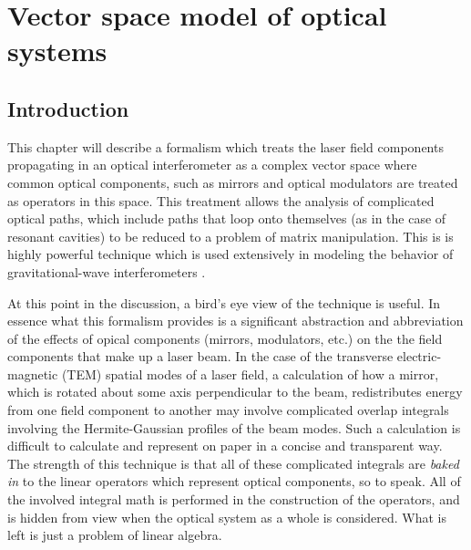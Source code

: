 

\chapter{Vector space model of optical systems}

\section{Introduction}
This chapter will describe a formalism which treats the laser field components propagating in an optical interferometer as a complex vector space where common optical components, such as mirrors and optical modulators are treated as operators in this space. %
This treatment allows the analysis of complicated optical paths, which include paths that loop onto themselves (as in the case of resonant cavities) to be reduced to a problem of matrix manipulation. %
This is is highly powerful technique which is used extensively in modeling the behavior of gravitational-wave interferometers \cite{Vinet1986,Hefetz:97,Sigg:00}.

At this point in the discussion, a bird's eye view of the technique is useful. %
In essence what this formalism provides is a significant abstraction and abbreviation of the effects of opical components (mirrors, modulators, etc.) on the the field components that make up a laser beam. %
In the case of the transverse electric-magnetic (TEM) spatial modes of a laser field, a calculation of how a mirror, which is rotated about some axis perpendicular to the beam, redistributes energy from one field component to another may involve complicated overlap integrals involving the Hermite-Gaussian profiles of the beam modes. %
Such a calculation is difficult to calculate and represent on paper in a concise and transparent way. %
The strength of this technique is that all of these complicated integrals are \emph{baked in} to the linear operators which represent optical components, so to speak. %
All of the involved integral math is performed in the construction of the operators, and is hidden from view when the optical system as a whole is considered. %
What is left is just a problem of linear algebra.

